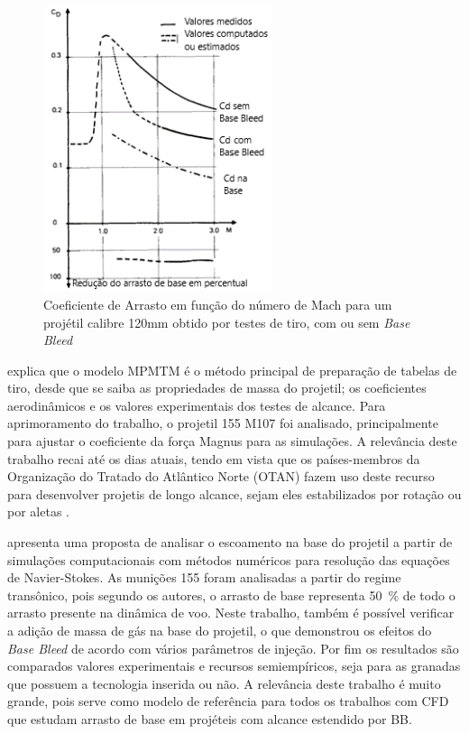 \begin{figure}[!ht]
	\centering
    \includegraphics[width=0.6\textwidth]{foto05-grafico2-andersson1976.png}
	\caption[Coeficiente de Arrasto em função do número de Mach para um projétil calibre 120mm obtido por testes de tiro, com ou sem \textit{Base Bleed}.]{Coeficiente de Arrasto em função do número de Mach para um projétil calibre 120mm obtido por testes de tiro, com ou sem \textit{Base Bleed} \cite{Andersson1976}}
	\label{fig5:andersson1976}
\end{figure}

\citeauthor{Lieske1966} explica que o modelo MPMTM é o método principal de preparação de tabelas de tiro, desde que se saiba as propriedades de massa do projetil; os coeficientes aerodinâmicos e os valores experimentais dos testes de alcance. Para aprimoramento do trabalho, o projetil \qty{155}{\millimetre} M107 foi analisado, principalmente para ajustar o coeficiente da força Magnus para as simulações. A relevância deste trabalho recai até os dias atuais, tendo em vista que os países-membros da Organização do Tratado do Atlântico Norte (OTAN) fazem uso deste recurso para desenvolver projetis de longo alcance, sejam eles estabilizados por rotação ou por aletas \cite{stanag4355}.

\citeauthor{Sahu1985} apresenta uma proposta de analisar o escoamento na base do projetil a partir de simulações computacionais com métodos numéricos para resolução das equações de Navier-Stokes. As munições \qty{155}{\millimetre} foram analisadas a partir do regime transônico, pois segundo os autores, o arrasto de base representa \qty{50}{\percent} de todo o arrasto presente na dinâmica de voo. Neste trabalho, também é possível verificar a adição de massa de gás na base do projetil, o que demonstrou os efeitos do \textit{Base Bleed} de acordo com vários parâmetros de injeção. Por fim os resultados são comparados valores experimentais e recursos semiempíricos, seja para as granadas que possuem a tecnologia inserida ou não. A relevância deste trabalho é muito grande, pois serve como modelo de referência para todos os trabalhos com CFD que estudam arrasto de base em projéteis com alcance estendido por BB.

